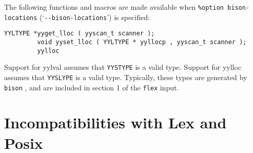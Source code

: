\documentclass[openany,oneside]{book}
\begin{document}
The following functions and macros are made available
when \verb`%option bison-locations` (‘\verb`--bison-locations`’) is specified:
\begin{verbatim}
YYLTYPE *yyget_lloc ( yyscan_t scanner );
         void yyset_lloc ( YYLTYPE * yyllocp , yyscan_t scanner );
         yylloc
\end{verbatim}


Support for yylval assumes that \verb`YYSTYPE` is a valid type.  Support for
yylloc assumes that \verb`YYSLYPE` is a valid type.  Typically, these types are
generated by \verb`bison` , and are included in section 1 of the \verb`flex` input.
\chapter{Incompatibilities with Lex and Posix}
\end{document}
